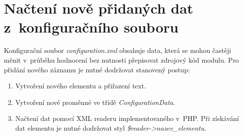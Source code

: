 \section{Načtení nově přidaných dat z~konfiguračního souboru}
Konfigurační soubor \textit{configuration.xml} obsahuje data, která se mohou častěji měnit v~průběhu hodnocení bez nutnosti přepisovat zdrojový kód modulu. Pro přidání nového záznamu je nutné dodržovat stanovený postup:
\begin{enumerate}
	\item Vytvoření nového elementu a přiřazení text.
	\item Vytvoření nové proměnné ve třídě \textit{ConfigurationData}.
	\item Načtení dat pomocí XML readeru implementovaného v~PHP. Při získávání dat elementu je nutné dodržovat styl \textit{\$reader->nazev\_elementu}. 
\end{enumerate}